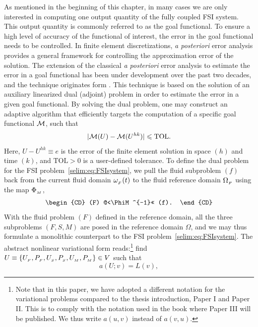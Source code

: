 As mentioned in the beginning of this chapter, in many cases we are
only interested in computing one output quantity of the fully coupled
FSI system. This output quantity is commonly referred to as the goal
functional.  To ensure a high level of accuracy of the functional of
interest, the error in the goal functional needs to be controlled. In
finite element discretizations, \emph{a posteriori} error analysis
provides a general framework for controlling the approximation error
of the solution.  The extension of the classical \emph{a posteriori}
error analysis to estimate the error in a goal functional has been
under development over the past two decades, and the technique
originates form \citet{ErikssonEstepEtAl1995,
BeckerRannacher2001}. This technique is based on the solution of an
auxiliary linearized dual (adjoint) problem in order to estimate the
error in a given goal functional. By solving the dual problem, one may
construct an adaptive algorithm that efficiently targets the
computation of a specific goal functional $\mathcal{M}$, such that
\begin{equation}
  \label{selim:eq:goalTOL}
|\mathcal{M}(U)-\mathcal{M}(U^{hk})| \leqslant \mathrm{TOL}.
\end{equation}
Here, $ U-U^{hk} \equiv e$ is the error of the finite element solution
in space $(h)$ and time $(k)$, and $\mathrm{TOL}>0$ is a user-defined
tolerance.  To define the dual problem for the FSI
problem~\eqref{selim:eq:FSIsystem}, we pull the fluid subproblem
$(f)$ back from the current fluid domain $\omega_{_{F}}(t)$ to the fluid reference
domain $\Omega_{_{F}}$ using the map $\Phi_{_{M}}$,
\begin{equation}
  \label{selim:eq:pullback}
  \begin{CD}
    (F) @<\PhiM^{-1}<< (f).
  \end{CD}
\end{equation}
With the fluid problem $(F)$ defined in the reference domain, all the
three subproblems $(F,S,M)$ are posed in the reference domain
$\Omega$, and we may thus formulate a monolithic counterpart to the
FSI problem~\eqref{selim:eq:FSIsystem}. The abstract nonlinear
variational form reads:\footnote{Note that in this paper, we have
  adopted a different notation for the variational problems compared
  to the thesis introduction, Paper I and Paper II. This is to comply
  with the notation used in the book where Paper III will be
  published. We thus write $a(u, v)$ instead of $a(v, u)$.} find
$U\equiv \{U_{_{F}}, P_{_{F}}, U_{_{S}}, P_{_{S}}, U_{_{M}}, P_{_{M}} \}\in V$ such that
\begin{equation}
\label{selim:eq:monolithic}
a(U;v) = L(v),
\end{equation}
